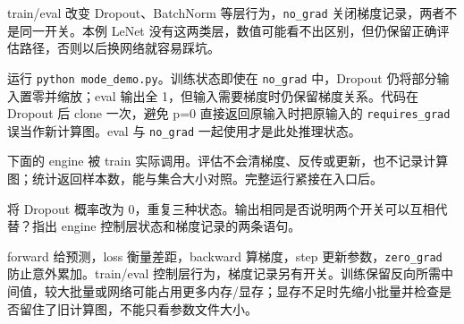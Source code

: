 train/eval 改变 Dropout、BatchNorm 等层行为，\texttt{no\_grad} 关闭梯度记录，两者不是同一开关。本例 LeNet 没有这两类层，数值可能看不出区别，但仍保留正确评估路径，否则以后换网络就容易踩坑。
\begin{example}[两个开关分开看]
运行 \texttt{python mode\_demo.py}。训练状态即使在 \texttt{no\_grad} 中，Dropout 仍将部分输入置零并缩放；eval 输出全 1，但输入需要梯度时仍保留梯度关系。代码在 Dropout 后 clone 一次，避免 p=0 直接返回原输入时把原输入的 \texttt{requires\_grad} 误当作新计算图。eval 与 \texttt{no\_grad} 一起使用才是此处推理状态。
\end{example}
\begin{dlblock}

\end{dlblock}
\begin{example}[一套循环负责训练和验证]
下面的 engine 被 train 实际调用。评估不会清梯度、反传或更新，也不记录计算图；统计返回样本数，能与集合大小对照。完整运行紧接在入口后。
\end{example}
\begin{dlblock}

\end{dlblock}
\begin{exercise}\label{ex:v2-dl-mode}
将 Dropout 概率改为 0，重复三种状态。输出相同是否说明两个开关可以互相代替？指出 engine 控制层状态和梯度记录的两条语句。
\end{exercise}
\begin{conclusion}
forward 给预测，loss 衡量差距，backward 算梯度，step 更新参数，\texttt{zero\_grad} 防止意外累加。train/eval 控制层行为，梯度记录另有开关。训练保留反向所需中间值，较大批量或网络可能占用更多内存/显存；显存不足时先缩小批量并检查是否留住了旧计算图，不能只看参数文件大小。
\end{conclusion}

